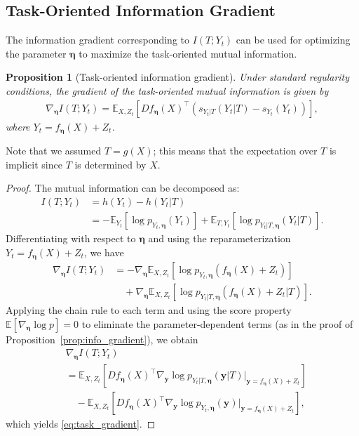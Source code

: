 \documentclass[conference]{IEEEtran}
\newtheorem{proposition}[theorem]{Proposition} %
\newcommand{\E}{\mathbb{E}}
\newcommand{\Yt}{Y_t}
\newcommand{\sYt}{s_{\Yt}}
\newcommand{\sYtT}{s_{\Yt|T}}
\begin{document}
\subsection{Task-Oriented Information Gradient}
\label{subsec:task_gradient}

The information gradient corresponding to $I(T;Y_t)$ can be used 
for optimizing the parameter $\bm \eta$ to maximize 
the task-oriented mutual information.

\begin{proposition}[Task-oriented information gradient]
\label{prop:task_gradient}
Under standard regularity conditions, the gradient of 
the task-oriented mutual information is given by
\begin{align}
\nabla_{\bm \eta} I(T; \Yt) = \E_{X,Z_t}\left[D f_{\bm \eta}(X)^\top \left(\sYtT(\Yt|T) 
- \sYt(\Yt)\right)\right],
\label{eq:task_gradient}
\end{align}
where $\Yt = f_{\bm \eta}(X) + Z_t$.
\end{proposition}
Note that we assumed $T=g(X)$;
this means that the expectation over $T$ is implicit since $T$ is determined by $X$.

\begin{proof}
The mutual information can be decomposed as:
\begin{align}
I(T; \Yt) 
&= h(\Yt) - h(\Yt|T)  \\
&= -\E_{\Yt}[\log p_{\Yt,\bm \eta}(\Yt)] + \E_{T,\Yt}[\log p_{\Yt|T,\bm \eta}(\Yt|T)].
\end{align}
Differentiating with respect to $\bm \eta$ 
and using the reparameterization $\Yt = f_{\bm \eta}(X) + Z_t$, we have
\begin{align}
\nabla_{\bm \eta} I(T; \Yt)
&= -\nabla_{\bm \eta} \E_{X,Z_t}[\log p_{\Yt,\bm \eta}(f_{\bm \eta}(X) + Z_t)] \nonumber \\
&\quad + \nabla_{\bm \eta} \E_{X,Z_t}[\log p_{\Yt|T,\bm \eta}(f_{\bm \eta}(X) + Z_t | T)].
\end{align}
Applying the chain rule to each term and using the score property 
$\E[\nabla_{\bm \eta} \log p] = 0$ to eliminate the parameter-dependent terms 
(as in the proof of Proposition~\ref{prop:info_gradient}), 
we obtain
\begin{align} \nonumber
&\nabla_{\bm \eta} I(T; \Yt) \\
&= \E_{X,Z_t}\left[D f_{\bm \eta}(X)^\top \nabla_{\bm y} \log p_{\Yt|T,\bm \eta}(\bm y|T)\big|_{\bm y=f_{\bm \eta}(X)+Z_t}\right] \nonumber \\
&\quad - \E_{X,Z_t}\left[D f_{\bm \eta}(X)^\top \nabla_{\bm y} \log p_{\Yt,\bm \eta}(\bm y)\big|_{\bm y=f_{\bm \eta}(X)+Z_t}\right],
\end{align}
which yields \eqref{eq:task_gradient}. 
\end{proof}
\end{document}
